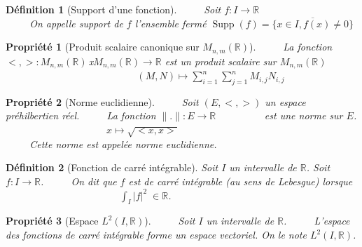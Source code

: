 \documentclass[a4paper,10pt]{report}
\theoremstyle{break}
\newtheorem{Def}{D\'{e}finition}
\newtheorem{Prop}{Propri\'{e}t\'{e}}
\begin{document}
    \begin{Def}[Support d'une fonction]
      $\phantom{Prop}$ Soit $f : I \rightarrow \mathbb{R}$ \\
      $\phantom{Prop}$ On appelle support de $f$ l'ensemble ferm\'{e} 
	  $ \operatorname{Supp}(f) = \overline {\big\{x\in I, f(x) \neq 0 \big\}}$
    \end{Def}

    
    \begin{Prop}[Produit scalaire canonique sur $M_{n,m}(\mathbb{R})$]
    
      $\phantom{Prop}$ La fonction $<,> : M_{n,m}(\mathbb{R}) \, $x$ M_{n,m}(\mathbb{R}) \longrightarrow \mathbb{R}$ 
	  est un produit scalaire sur $ M_{n,m}(\mathbb{R}) $\\
      $\phantom{Prop La fonction <,> : M_{n,m}}$ $(M, N) \longmapsto \displaystyle \sum_{i = 1}^n 
	    \displaystyle \sum_{j = 1}^n M_{i,j} N_{i,j} $
    \end{Prop}

    
    \begin{Prop}[Norme euclidienne]
    
      $\phantom{Prop}$ Soit $(E, <,>)$ un espace pr\'{e}hilbertien r\'{e}el. \newline
      $\phantom{Prop}$ La fonction $ \parallel . \parallel : E \longrightarrow \mathbb{R}$ $\phantom{<x,x>}$
	  est une norme sur $E$.\\
      $\phantom{Prop La fonction \parallel . \parallel :}$ $x \longmapsto \displaystyle \sqrt{<x,x>} $ \\ 
      $\phantom{Prop}$ Cette norme est appel\'{e}e norme euclidienne.
    \end{Prop}

      
    \begin{Def}[Fonction de carr\'{e} int\'{e}grable]
    
	Soit $I$ un intervalle de $\mathbb{R}$. Soit $ f : I \rightarrow \mathbb{R} $. \newline
	$\phantom{Prop}$ On dit que $f$ est de carr\'{e} int\'{e}grable (au sens de Lebesgue) lorsque \newline 
	$\phantom{Prop On dit que f est de carre}$ $\int_{I} | f |^2 \; \in \mathbb{R}$.
	
    \end{Def}
      
    \begin{Prop}[Espace $L^2(I,\mathbb{R})$]
	$\phantom{Prop}$ Soit $I$ un intervalle de $\mathbb{R}$.\newline
	$\phantom{Prop}$ L'espace des fonctions de carr\'{e} int\'{e}grable forme un espace vectoriel. On le note $L^2(I,\mathbb{R})$.
    \end{Prop}
\end{document}
